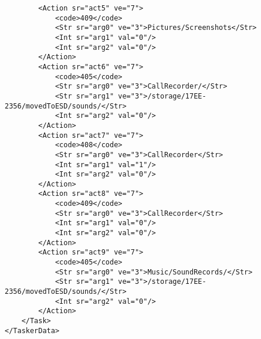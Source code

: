 \begin{verbatim}
        <Action sr="act5" ve="7">
            <code>409</code>
            <Str sr="arg0" ve="3">Pictures/Screenshots</Str>
            <Int sr="arg1" val="0"/>
            <Int sr="arg2" val="0"/>
        </Action>
        <Action sr="act6" ve="7">
            <code>405</code>
            <Str sr="arg0" ve="3">CallRecorder/</Str>
            <Str sr="arg1" ve="3">/storage/17EE-2356/movedToESD/sounds/</Str>
            <Int sr="arg2" val="0"/>
        </Action>
        <Action sr="act7" ve="7">
            <code>408</code>
            <Str sr="arg0" ve="3">CallRecorder</Str>
            <Int sr="arg1" val="1"/>
            <Int sr="arg2" val="0"/>
        </Action>
        <Action sr="act8" ve="7">
            <code>409</code>
            <Str sr="arg0" ve="3">CallRecorder</Str>
            <Int sr="arg1" val="0"/>
            <Int sr="arg2" val="0"/>
        </Action>
        <Action sr="act9" ve="7">
            <code>405</code>
            <Str sr="arg0" ve="3">Music/SoundRecords/</Str>
            <Str sr="arg1" ve="3">/storage/17EE-2356/movedToESD/sounds/</Str>
            <Int sr="arg2" val="0"/>
        </Action>
    </Task>
</TaskerData>
\end{verbatim}